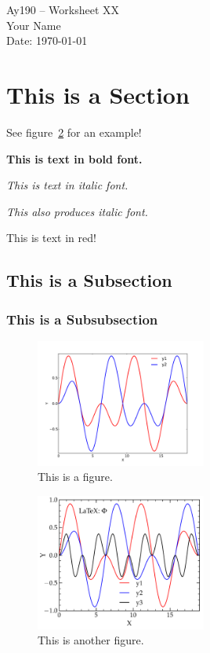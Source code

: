 \documentclass[11pt,letterpaper]{article}
\begin{document}
\begin{center}
\Large
Ay190 -- Worksheet XX\\
Your Name\\
Date: \today
\end{center}

\section{This is a Section}

See figure~\ref{fig:simpleplot2} for an example!

{\bf This is text in bold font.}

\emph{This is text in italic font.}

{\it This also produces italic font.}

{\color{red} This is text in red!}

\subsection{This is a Subsection}

\subsubsection{This is a Subsubsection}

\begin{figure}[bth]
\centering
\includegraphics[width=0.5\textwidth]{simpleplot.pdf}
\caption{This is a figure.}
\label{fig:simpleplot}
\end{figure}

\begin{figure}[bth]
\centering
\includegraphics[width=0.5\textwidth]{simpleplot2.pdf}
\caption{This is another figure.}
\label{fig:simpleplot2}
\end{figure}
\end{document}
